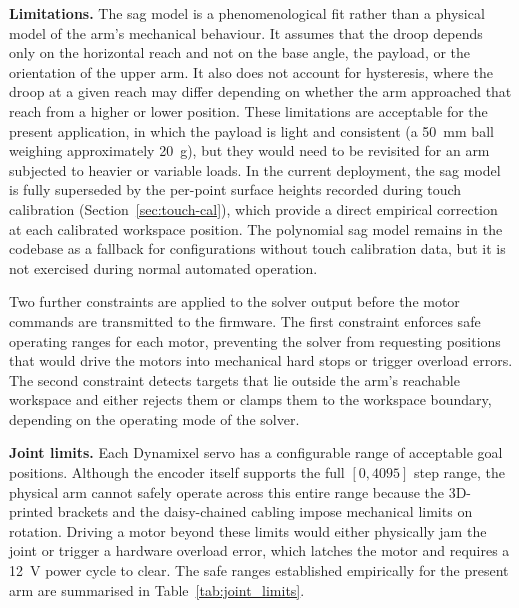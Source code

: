 \textbf{Limitations.} The sag model is a phenomenological fit 
rather than a physical model of the arm's mechanical behaviour. 
It assumes that the droop depends only on the horizontal reach 
and not on the base angle, the payload, or the orientation of 
the upper arm. It also does not account for hysteresis, where 
the droop at a given reach may differ depending on whether the 
arm approached that reach from a higher or lower position. These 
limitations are acceptable for the present application, in which 
the payload is light and consistent (a 50~mm ball weighing 
approximately 20~g), but they would need to be revisited for an 
arm subjected to heavier or variable loads. In the current 
deployment, the sag model is fully superseded by the per-point 
surface heights recorded during touch calibration 
(Section~\ref{sec:touch-cal}), which provide a direct empirical correction at 
each calibrated workspace position. The polynomial sag model 
remains in the codebase as a fallback for configurations 
without touch calibration data, but it is not exercised during 
normal automated operation.

\label{sec:joint-limits}

Two further constraints are applied to the solver output before 
the motor commands are transmitted to the firmware. The first 
constraint enforces safe operating ranges for each motor, 
preventing the solver from requesting positions that would drive 
the motors into mechanical hard stops or trigger overload errors. 
The second constraint detects targets that lie outside the arm's 
reachable workspace and either rejects them or clamps them to the 
workspace boundary, depending on the operating mode of the 
solver.

\textbf{Joint limits.} Each Dynamixel servo has a configurable 
range of acceptable goal positions. Although the encoder itself 
supports the full $[0, 4095]$ step range, the physical arm 
cannot safely operate across this entire range because the 
3D-printed brackets and the daisy-chained cabling impose 
mechanical limits on rotation. Driving a motor beyond these 
limits would either physically jam the joint or trigger a 
hardware overload error, which latches the motor and requires a 
12~V power cycle to clear. The safe ranges established 
empirically for the present arm are summarised in Table~\ref{tab:joint_limits}.


